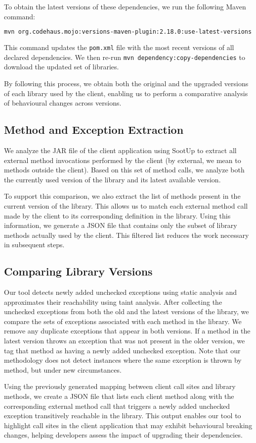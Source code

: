 To obtain the latest versions of these dependencies, we run the following Maven command:
\begin{lstlisting}[language=bash, breaklines=true, basicstyle=\ttfamily\small]
mvn org.codehaus.mojo:versions-maven-plugin:2.18.0:use-latest-versions
\end{lstlisting}
This command updates the \texttt{pom.xml} file with the most recent versions of all declared dependencies. We then re-run \texttt{mvn dependency:copy-dependencies} to download the updated set of libraries.

By following this process, we obtain both the original and the upgraded versions of each library used by the client, enabling us to perform a comparative analysis of behavioural changes across versions.

\subsection{Method and Exception Extraction}

We analyze the JAR file of the client application using SootUp to extract all external method invocations performed by the client (by external, we mean to methods outside the client). Based on this set of method calls, we analyze both the currently used version of the library and its latest available version.

To support this comparison, we also extract the list of methods present in the current version of the library. This allows us to match each external method call made by the client to its corresponding definition in the library. Using this information, we generate a JSON file that contains only the subset of library methods actually used by the client. This filtered list reduces the work necessary in subsequent steps.

\subsection{Comparing Library Versions}

Our tool detects newly added unchecked exceptions using static analysis and approximates their reachability using taint analysis. After collecting the unchecked exceptions from both the old and the latest versions of the library, we compare the sets of exceptions associated with each method in the library. We remove any duplicate exceptions that appear in both versions. If a method in the latest version throws an exception that was not present in the older version, we tag that method as having a newly added unchecked exception. Note that our methodology does not detect instances where the same exception is thrown by method, but under new circumstances.

Using the previously generated mapping between client call sites and library methods, we create a JSON file that lists each client method along with the corresponding external method call that triggers a newly added unchecked exception transitively reachable in the library. This output enables our tool to highlight call sites in the client application that may exhibit behavioural breaking changes, helping developers assess the impact of upgrading their dependencies.
